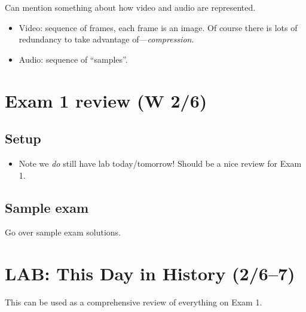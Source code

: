 \documentclass{article}
\newcommand{\ready}{\textcolor{Green}{\Checkmark}\xspace}
\begin{document}
Can mention something about how video and audio are represented.
\begin{itemize}
\item Video: sequence of frames, each frame is an image.  Of course
  there is lots of redundancy to take advantage
  of---\emph{compression}.
\item Audio: sequence of ``samples''.
\end{itemize}

\newpage
\section{\ready Exam 1 review (W 2/6)}

\subsection*{Setup}

\begin{itemize}
\item Note we \emph{do} still have lab today/tomorrow!  Should be a
  nice review for Exam 1.
\end{itemize}

\subsection*{Sample exam}

Go over sample exam solutions.

\newpage
\section*{\ready LAB: This Day in History (2/6--7)}

This can be used as a comprehensive review of everything on Exam 1.
\end{document}
